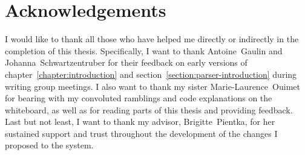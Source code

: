 \chapter*{Acknowledgements}\label{chapter:acknowledgments}

I would like to thank all those who have helped me directly or indirectly in the completion of this thesis.
Specifically, I want to thank Antoine~Gaulin and Johanna~Schwartzentruber for their feedback on early versions of chapter~\ref{chapter:introduction} and section~\ref{section:parser-introduction} during writing group meetings.
I also want to thank my sister Marie-Laurence~Ouimet for bearing with my convoluted ramblings and code explanations on the whiteboard, as well as for reading parts of this thesis and providing feedback.
Last but not least, I want to thank my advisor, Brigitte~Pientka, for her sustained support and trust throughout the development of the changes I proposed to the \Beluga system.


